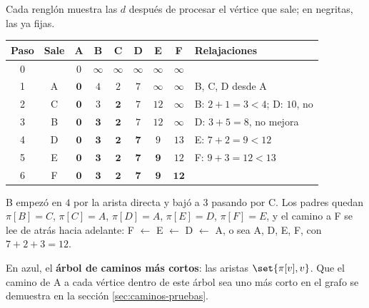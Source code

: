 \documentclass[11pt,letterpaper]{article}
\begin{document}
\begin{ejemplo}
  Cada renglón muestra las $d$ después de procesar el vértice que
  sale; en negritas, las ya fijas.
  \begin{center}
  \small
  \begin{tabular}{ccccccccl}
    \toprule
    \textbf{Paso} & \textbf{Sale} & A & B & C & D & E & F
      & \textbf{Relajaciones} \\
    \midrule
    0 & & $0$ & $\infty$ & $\infty$ & $\infty$ & $\infty$ & $\infty$
      & \\
    1 & A & $\mathbf{0}$ & $4$ & $2$ & $7$ & $\infty$ & $\infty$
      & B, C, D desde A \\
    2 & C & $\mathbf{0}$ & $3$ & $\mathbf{2}$ & $7$ & $12$ & $\infty$
      & B: $2 + 1 = 3 < 4$; D: $10$, no \\
    3 & B & $\mathbf{0}$ & $\mathbf{3}$ & $\mathbf{2}$ & $7$ & $12$
      & $\infty$ & D: $3 + 5 = 8$, no mejora \\
    4 & D & $\mathbf{0}$ & $\mathbf{3}$ & $\mathbf{2}$ & $\mathbf{7}$
      & $9$ & $13$ & E: $7 + 2 = 9 < 12$ \\
    5 & E & $\mathbf{0}$ & $\mathbf{3}$ & $\mathbf{2}$ & $\mathbf{7}$
      & $\mathbf{9}$ & $12$ & F: $9 + 3 = 12 < 13$ \\
    6 & F & $\mathbf{0}$ & $\mathbf{3}$ & $\mathbf{2}$ & $\mathbf{7}$
      & $\mathbf{9}$ & $\mathbf{12}$ & \\
    \bottomrule
  \end{tabular}
  \end{center}
  B empezó en $4$ por la arista directa y bajó a $3$ pasando por C. Los
  padres quedan $\pi[B] = C$, $\pi[C] = A$, $\pi[D] = A$,
  $\pi[E] = D$, $\pi[F] = E$, y el camino a F se lee de atrás hacia
  adelante: F $\leftarrow$ E $\leftarrow$ D $\leftarrow$ A, o sea
  A, D, E, F, con $7 + 2 + 3 = 12$.
  \begin{center}
  \end{center}
  En azul, el \textbf{árbol de caminos más cortos}: las aristas
  $\set{\pi[v], v}$. Que el camino de A a cada vértice dentro de este
  árbol sea uno más corto en el grafo se demuestra en la sección
  \ref{sec:caminos-pruebas}.
\end{ejemplo}
\end{document}
